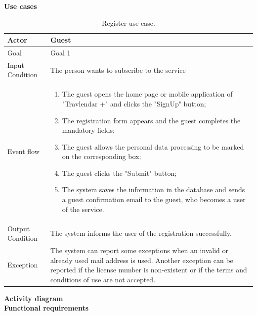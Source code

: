 \documentclass{article}
\begin{document}
	\bigskip
	\noindent
	\textbf{Use cases} \\

	\begin{table}[htp]
	\caption{Register use case.}
		\begin{center}
    			\begin{tabular}{p{}|p{}}
   			 	\hline
    				Actor & Guest \\ \hline
    				Goal & Goal 1 \\ \hline
    				Input Condition & The person wants to subscribe to the service \\ \hline
    				Event flow & 
				\begin{enumerate}
  					\item The guest opens the home page or mobile application of "Travlendar +"  and clicks the "SignUp" button;
  					\item The registration form appears and the guest completes the mandatory fields;
  					\item The guest allows the personal data processing to be marked on the corresponding box;
  					\item The guest clicks the "Submit" button;
  					\item The system saves the information in the database and sends a guest confirmation email to the guest, who becomes a user of the service.
 				 \end{enumerate} \\ \hline
    				Output Condition & The system informs the user of the registration successfully. \\ \hline
    				Exception & The system can report some exceptions when an invalid or already used mail address is used. Another exception can be reported if the license number is non-existent or if the terms and conditions of use are not accepted. \\ \hline
    			\end{tabular}
		\end{center}
	\end{table}
	
	
	\bigskip
	\noindent
	\textbf{Activity diagram} \\
	
	
	\bigskip
	\noindent
	\textbf{Functional requirements} \\
	
\end{document}
